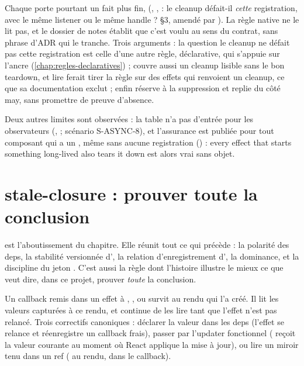 \begin{decision}
Chaque  porte pourtant un fait plus fin,  (, ,  : le cleanup défait-il \emph{cette} registration, avec le même listener ou le même handle ?  §3, amendé par ). La règle native ne le lit pas, et le dossier de notes établit que c'est voulu au sens du contrat, sans phrase d'ADR qui le tranche. Trois arguments : la question \og le cleanup ne défait pas cette registration\fg{} est celle d'une autre règle, déclarative, qui s'appuie sur l'ancre  (\cref{chap:regles-declaratives}) ;  couvre aussi \og un cleanup lisible sans le bon teardown\fg{}, et lire  ferait tirer la règle sur des effets qui renvoient un cleanup, ce que sa documentation exclut ; enfin  réserve  à la suppression et replie  du côté may, sans promettre de preuve d'absence.
\end{decision}

Deux autres limites sont observées : la table n'a pas d'entrée pour les observateurs (,  ; scénario S-ASYNC-8), et l'assurance est publiée pour tout composant qui a un , même sans aucune registration () : \og every effect that starts something long-lived also tears it down\fg{} est alors vrai sans objet.


\section{stale-closure : prouver toute la conclusion}
\label{sec:regles-effets-stale-closure}

 est l'aboutissement du chapitre. Elle réunit tout ce qui précède : la polarité des deps, la stabilité versionnée d', la relation d'enregistrement d', la dominance, et la discipline du jeton . C'est aussi la règle dont l'histoire illustre le mieux ce que veut dire, dans ce projet, \og prouver \emph{toute} la conclusion\fg{}.

\begin{react}
Un callback remis dans un effet à , ,  ou  survit au rendu qui l'a créé. Il lit les valeurs capturées à ce rendu, et continue de les lire tant que l'effet n'est pas relancé. Trois correctifs canoniques : déclarer la valeur dans les deps (l'effet se relance et réenregistre un callback frais), passer par l'updater fonctionnel ( reçoit la valeur courante au moment où React applique la mise à jour), ou lire un miroir tenu dans un ref ( au rendu,  dans le callback).
\end{react}

